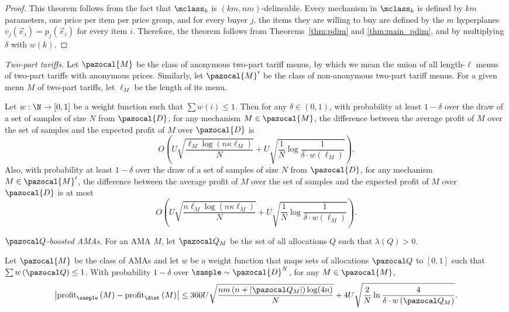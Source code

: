 \itemSPM*

\begin{proof}
This theorem follows from the fact that $\mclass_k$ is $(km, nm)$-delineable. Every mechanism in $\mclass_k$ is defined by $km$ parameters, one price per item per price group, and for every buyer $j$, the items they are willing to buy are defined by the $m$ hyperplanes $v_j(\vec{e}_i) = p_j(\vec{e}_i)$ for every item $i$. Therefore, the theorem follows from Theorems~\ref{thm:pdim} and \ref{thm:main_pdim}, and by multiplying $\delta$ with $w(k)$.
\end{proof}

\bigskip\emph{Two-part tariffs.} Let $\pazocal{M}$ be the class of anonymous two-part tariff menus, by which we mean the union of all length-$\ell$ menus of two-part tariffs with anonymous prices. Similarly, let $\pazocal{M}'$ be the class of non-anonymous two-part tariff menus. For a given menu $M$ of two-part tariffs, let $\ell_M$ be the length of its menu.

\begin{theorem}\label{thm:2part_nonuniform}
Let $w: \N \to [0,1]$ be a weight function such that $\sum w(i) \leq 1$. Then for any $\delta \in (0,1)$, with probability at least $1-\delta$ over the draw of a set of samples of size $N$ from $\pazocal{D}$, for any mechanism $M \in \pazocal{M}$, the difference between the average profit of $M$ over the set of samples and the expected profit of $M$ over $\pazocal{D}$ is 
\[O\left(U\sqrt{\frac{\ell_M \log(n\kappa\ell_M)}{N}} + U\sqrt{\frac{1}{N} \log \frac{1}{\delta \cdot w(\ell_M)}}\right).\] Also, with probability at least $1-\delta$ over the draw of a set of samples of size $N$ from $\pazocal{D}$, for any mechanism $M \in \pazocal{M}'$, the difference between the average profit of $M$ over the set of samples and the expected profit of $M$ over $\pazocal{D}$ is at most \[O\left(U\sqrt{\frac{n\ell_M \log(n\kappa\ell_M)}{N}} + U\sqrt{\frac{1}{N} \log \frac{1}{\delta \cdot w(\ell_M)}}\right).\]
\end{theorem}

\bigskip\emph{$\Qset$-boosted AMAs.} For an AMA $M$, let $\Qset_M$ be the set of all allocations $Q$  such that $\lambda\left(Q\right) > 0$.
\begin{theorem}\label{thm:Oboosted_SPM}
	Let $\pazocal{M}$ be the class of AMAs and let $w$ be a weight function that maps sets of allocations $\Qset$ to $[0,1]$ such that $\sum w\left(\Qset\right) \leq 1$. With probability $1-\delta$ over $\sample \sim \pazocal{D}^N$, for any $M \in \pazocal{M}$, \[\left|\profit_{\sample}\left(M\right) - \profit_{\dist}\left(M\right)\right| \leq 360U \sqrt{\frac{nm\left(n+|\Qset_M|\right)\log(4n)}{N}} + 4U\sqrt{\frac{2}{N}\ln\frac{4}{\delta \cdot w\left(\Qset_M\right)}}.\]
\end{theorem}

